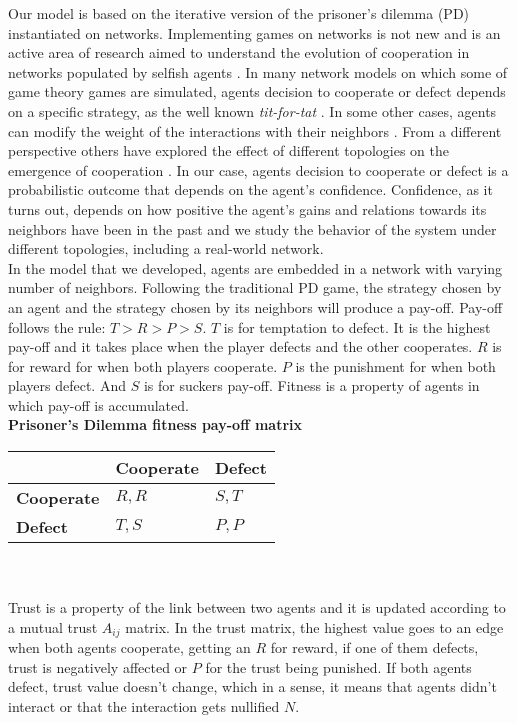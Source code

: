 Our model is based on the iterative version of the prisoner's dilemma (PD)
instantiated on networks. Implementing games on networks is not new
and is an active area of research aimed to understand the evolution of
cooperation in networks populated by selfish agents
\cite{Szabo2007,Nowak1992,Nowak2006}. In many network models on which some of game
theory games are simulated, agents decision to cooperate or defect
depends on a specific strategy, as the well known \textit{tit-for-tat}
\cite{Axelrod2006,Nowak2011}. In some other cases, agents can modify the weight
of the interactions with their neighbors \cite{Santos2006}. From a different perspective
others have explored the effect of different topologies on the
emergence of cooperation \cite{Santos2005,Hauert2004}. In our case, agents decision
to cooperate or defect is a probabilistic outcome that depends on the
agent's confidence. Confidence, as it turns out, depends on how
positive the agent's gains and relations towards its neighbors
have been in the past and we study the behavior of the system under different topologies, including a real-world network. \\

In the model that we developed, agents are embedded in a network with
varying number of neighbors. Following the traditional PD game, the
strategy chosen by an agent and the strategy chosen by its neighbors
will produce a pay-off. Pay-off follows the rule: $T > R > P > S$. $T$
is for temptation to defect. It is the highest pay-off and it takes
place when the player defects and the other cooperates. $R$ is for
reward for when both players cooperate. $P$ is the punishment for when
both players defect. And $S$ is for suckers pay-off. Fitness is a
property of agents in which pay-off is accumulated.\\ 

{\bf Prisoner's Dilemma fitness pay-off matrix}\\

\begin{tabular}{| l | l | l |}
\hline
          & \bf{Cooperate} & \bf{Defect} \\ \hline
\bf{Cooperate} &  $R,R$      &  $S,T$   \\ \hline
\bf{Defect}    &  $T,S$      &  $P,P$   \\ \hline

\end{tabular}\\ \\

Trust is a property of the link between two agents and it is updated
according to a mutual trust $A_{ij}$ matrix. In the trust matrix, the
highest value goes to an edge when both agents cooperate, getting an
$R$ for reward, if one of them defects, trust is negatively affected
or $P$ for the trust being punished. If both agents defect, trust
value doesn't change, which in a sense, it means that agents didn't
interact or that the interaction gets nullified $N$. \\

